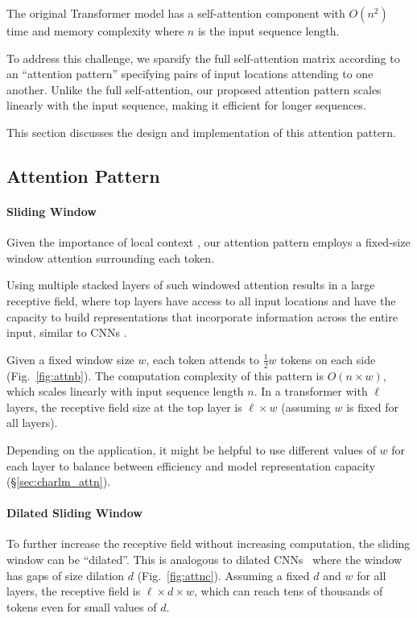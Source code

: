 The original Transformer model has a self-attention component with $O(n^2)$ time and memory complexity where $n$ is the input sequence length. 

To address this challenge, we sparsify the full self-attention matrix according to an ``attention pattern'' specifying pairs of input locations attending to one another. Unlike the full self-attention, our proposed attention pattern scales linearly with the input sequence, making it efficient for longer sequences.

This section discusses the design and implementation of this attention pattern. 

\subsection{Attention Pattern}
\label{sec:attn}

\paragraph{Sliding Window} Given the importance of local context \cite{Kovaleva2019RevealingTD}, our attention pattern employs a fixed-size window attention surrounding each token.

Using multiple stacked layers of such windowed attention results in a large receptive field, where top layers have access to all input locations and have the capacity to build representations that incorporate information across the entire input, similar to CNNs \cite{Wu2019PayLA}.

Given a fixed window size $w$, each token attends to $\frac{1}{2}w$ tokens on each side (Fig.~\ref{fig:attnb}).
The computation complexity of this pattern is $O(n \times w)$, which scales linearly with input sequence length $n$. In a transformer with $\ell$ layers, the receptive field size at the top layer is $\ell \times w$ (assuming $w$ is fixed for all layers).

Depending on the application, it might be helpful to use different values of $w$ for each layer to balance between efficiency and model representation capacity (\S\ref{sec:charlm_attn}).

\paragraph{Dilated Sliding Window} To further increase the receptive field without increasing computation, the sliding window can be ``dilated''. This is analogous to dilated CNNs~\cite{Oord2016WaveNetAG} where the window has gaps of size dilation $d$ (Fig.~\ref{fig:attnc}).
Assuming a fixed $d$ and $w$ for all layers, the receptive field is $\ell \times d \times w$, which can reach tens of thousands of tokens even for small values of $d$. 

